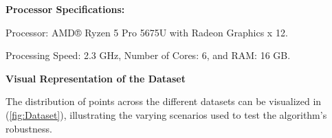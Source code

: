 \vspace*{6mm}  

\textbf{Processor Specifications:}


Processor: AMD® Ryzen 5 Pro 5675U with Radeon Graphics x 12.


Processing Speed: 2.3 GHz, Number of Cores: 6, and RAM: 16 GB.


\vspace*{6mm}  

\textbf{Visual Representation of the Dataset}

The distribution of points across the different datasets can be visualized in (\autoref{fig:Dataset}), illustrating the varying scenarios used to test the algorithm's robustness.








